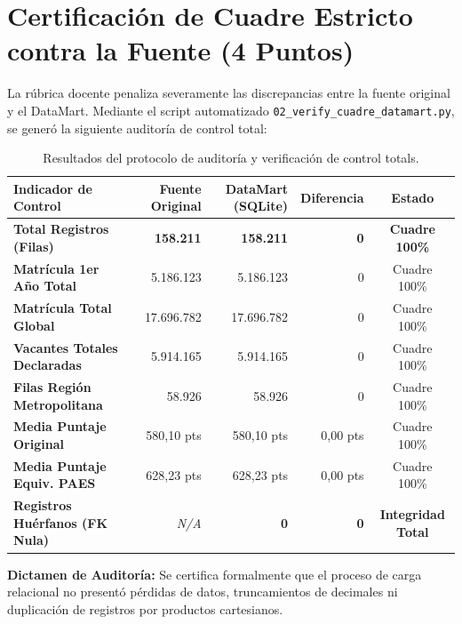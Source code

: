 \documentclass[11pt,a4paper]{article}
\begin{document}
\section{Certificación de Cuadre Estricto contra la Fuente (4 Puntos)}
La rúbrica docente penaliza severamente las discrepancias entre la fuente original y el DataMart. Mediante el script automatizado \texttt{02\_verify\_cuadre\_datamart.py}, se generó la siguiente auditoría de control total:

\begin{table}[h!]
\centering
\small
\begin{tabular}{|l|r|r|r|c|}
\hline
\textbf{Indicador de Control} & \textbf{Fuente Original} & \textbf{DataMart (SQLite)} & \textbf{Diferencia} & \textbf{Estado} \\
\hline
\textbf{Total Registros (Filas)} & \textbf{158.211} & \textbf{158.211} & \textbf{0} & \textbf{Cuadre 100\%} \\
\textbf{Matrícula 1er Año Total} & 5.186.123 & 5.186.123 & 0 & Cuadre 100\% \\
\textbf{Matrícula Total Global} & 17.696.782 & 17.696.782 & 0 & Cuadre 100\% \\
\textbf{Vacantes Totales Declaradas} & 5.914.165 & 5.914.165 & 0 & Cuadre 100\% \\
\textbf{Filas Región Metropolitana} & 58.926 & 58.926 & 0 & Cuadre 100\% \\
\textbf{Media Puntaje Original} & 580,10 pts & 580,10 pts & 0,00 pts & Cuadre 100\% \\
\textbf{Media Puntaje Equiv. PAES} & 628,23 pts & 628,23 pts & 0,00 pts & Cuadre 100\% \\
\hline
\textbf{Registros Huérfanos (FK Nula)} & \textit{N/A} & \textbf{0} & \textbf{0} & \textbf{Integridad Total} \\
\hline
\end{tabular}
\caption{Resultados del protocolo de auditoría y verificación de control totals.}
\end{table}

\textbf{Dictamen de Auditoría:} Se certifica formalmente que el proceso de carga relacional no presentó pérdidas de datos, truncamientos de decimales ni duplicación de registros por productos cartesianos.

\end{document}
